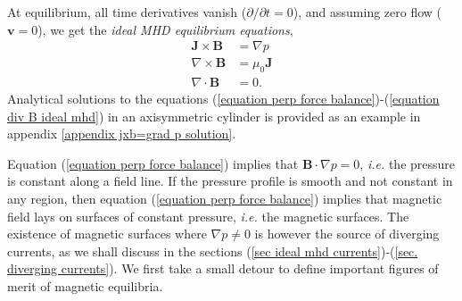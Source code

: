 \documentclass[my_thesis.tex]{subfiles}
\begin{document}
At equilibrium, all time derivatives vanish ($\partial/\partial t = 0$), and assuming zero flow ($\mathbf{v}=0$), we get the \emph{ideal MHD equilibrium equations},
\begin{align}
	\mathbf{J}\times\mathbf{B} &= \nabla p \label{equation perp force balance}\\
	\nabla\times\mathbf{B} &=\mu_0\mathbf{J}\\
	\nabla\cdot\mathbf{B}&=0.\label{equation div B ideal mhd}
\end{align}
Analytical solutions to the equations (\ref{equation perp force balance})-(\ref{equation div B ideal mhd}) in an axisymmetric cylinder is provided as an example in appendix \ref{appendix jxb=grad p solution}.

Equation (\ref{equation perp force balance}) implies that $\mathbf{B}\cdot\nabla p=0$, \textit{i.e.} the pressure is constant along a field line. If the pressure profile is smooth and not constant in any region, then equation (\ref{equation perp force balance}) implies that magnetic field lays on surfaces of constant pressure, \textit{i.e.} the magnetic surfaces. The existence of magnetic  surfaces where $\nabla p\neq 0$ is however the source of diverging currents, as we shall discuss in the sections (\ref{sec ideal mhd currents})-(\ref{sec. diverging currents}). We first take a small detour to define important figures of merit of magnetic equilibria.


\end{document}
